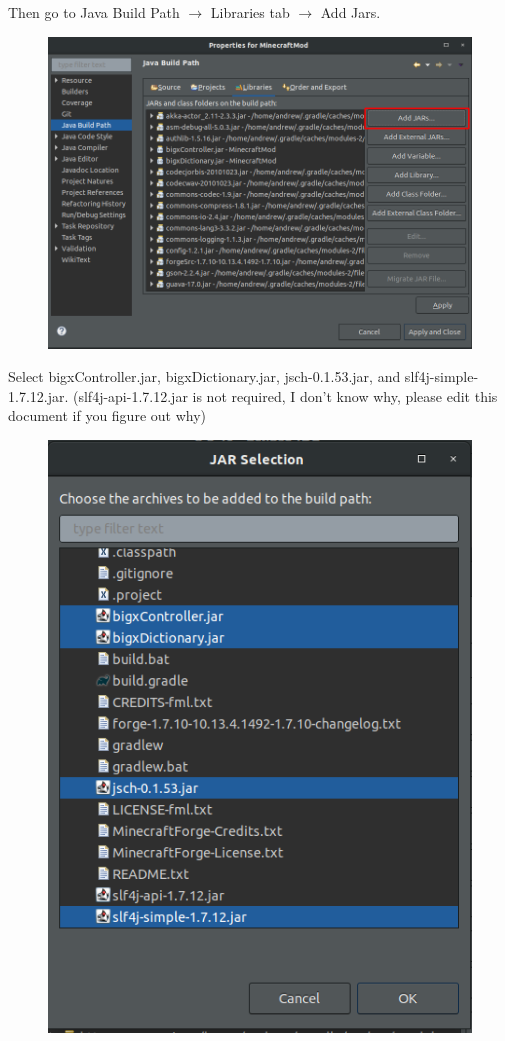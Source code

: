\documentclass[12pt]{article}
\begin{document}
\begin{steps}
	  Then go to Java Build Path $\rightarrow$ Libraries tab $\rightarrow$ Add Jars.

	\begin{figure}[H]
		\includegraphics[scale=0.3]{images/setup/AddJars.png}
		\centering
	\end{figure}

	Select bigxController.jar, bigxDictionary.jar, jsch-0.1.53.jar, and slf4j-simple-1.7.12.jar. (slf4j-api-1.7.12.jar is not required, I don't know why, please edit this document if you figure out why)

	\begin{figure}[H]
		\includegraphics[scale=0.3]{images/setup/WhichJars.png}
		\centering
	\end{figure}


\end{steps}
\end{document}
